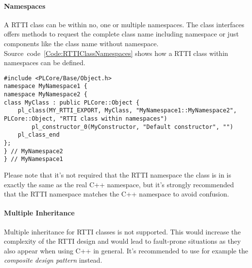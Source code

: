 \paragraph{Namespaces}
A RTTI class can be within no, one or multiple namespaces. The class interfaces offers methods to request the complete class name including namespace or just components like the class name without namespace. Source~code~\ref{Code:RTTIClassNamespaces} shows how a RTTI class within namespaces can be defined.
\begin{lstlisting}[float=htb,label=Code:RTTIClassNamespaces,caption={Using namespaces within the RTTI}]
#include <PLCore/Base/Object.h>
namespace MyNamespace1 {
namespace MyNamespace2 {
class MyClass : public PLCore::Object {
	pl_class(MY_RTTI_EXPORT, MyClass, "MyNamespace1::MyNamespace2", PLCore::Object, "RTTI class within namespaces")
		pl_constructor_0(MyConstructor, "Default constructor", "")
	pl_class_end
};
} // MyNamespace2
} // MyNamespace1
\end{lstlisting}
Please note that it's not required that the RTTI namespace the class is in is exactly the same as the real C++ namespace, but it's strongly recommended that the RTTI namespace matches the C++ namespace to avoid confusion.


\paragraph{Multiple Inheritance}
Multiple inheritance for RTTI classes is not supported. This would increase the complexity of the RTTI design and would lead to fault-prone situations as they also appear when using C++ in general. It's recommended to use for example the \emph{composite design pattern} instead.


